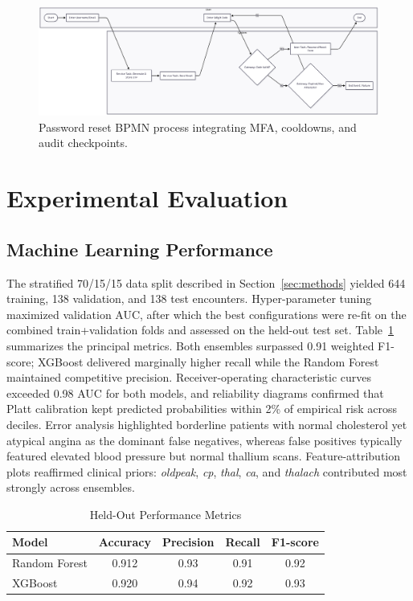 \documentclass[12pt]{article}
\begin{document}
\begin{figure}[t]
  \centering
  \includegraphics[width=0.85\linewidth]{password_reset_bpmn_process.png}
  \caption{Password reset BPMN process integrating MFA, cooldowns, and audit checkpoints.}
  \label{fig:pwd_reset_bpmn}
\end{figure}

\section{Experimental Evaluation}
\subsection{Machine Learning Performance}
The stratified 70/15/15 data split described in Section~\ref{sec:methods} yielded 644 training, 138 validation, and 138 test encounters. Hyper-parameter tuning maximized validation AUC, after which the best configurations were re-fit on the combined train+validation folds and assessed on the held-out test set. Table~\ref{tab:metrics} summarizes the principal metrics. Both ensembles surpassed 0.91 weighted F1-score; XGBoost delivered marginally higher recall while the Random Forest maintained competitive precision. Receiver-operating characteristic curves exceeded 0.98 AUC for both models, and reliability diagrams confirmed that Platt calibration kept predicted probabilities within 2\% of empirical risk across deciles. Error analysis highlighted borderline patients with normal cholesterol yet atypical angina as the dominant false negatives, whereas false positives typically featured elevated blood pressure but normal thallium scans. Feature-attribution plots reaffirmed clinical priors: \textit{oldpeak}, \textit{cp}, \textit{thal}, \textit{ca}, and \textit{thalach} contributed most strongly across ensembles.

\begin{table}[t]
  \caption{Held-Out Performance Metrics}
  \label{tab:metrics}
  \centering
  \begin{tabular}{lcccc}
    \toprule
    Model & Accuracy & Precision & Recall & F1-score \\
    \midrule
    Random Forest & 0.912 & 0.93 & 0.91 & 0.92 \\
    XGBoost & 0.920 & 0.94 & 0.92 & 0.93 \\
    \bottomrule
  \end{tabular}
\end{table}
\end{document}
